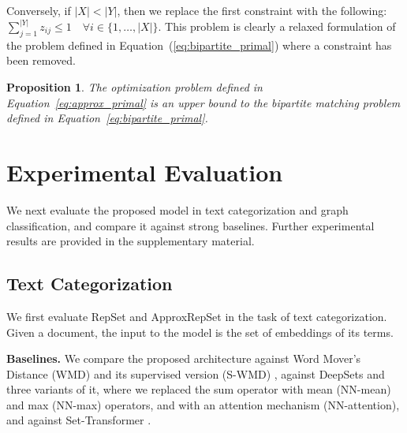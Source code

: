 \documentclass[twoside]{article}
\newtheorem{proposition}{Proposition}
\begin{document}
Conversely, if $|X| < |Y|$, then we replace the first constraint with the following: $\sum_{j=1}^{|Y|} z_{ij} \leq 1 \quad \forall i \in \{ 1,\ldots,|X| \} $.
This problem is clearly a relaxed formulation of the problem defined in Equation~(\ref{eq:bipartite_primal}) where a constraint has been removed.
\begin{proposition}
    The optimization problem defined in Equation~\ref{eq:approx_primal} is an upper bound to the bipartite matching problem defined in Equation~\ref{eq:bipartite_primal}.
\end{proposition}

\section{Experimental Evaluation}\label{sec:experiments}
We next evaluate the proposed model in text categorization and graph classification, and compare it against strong baselines.
Further experimental results are provided in the supplementary material.

\subsection{Text Categorization}
We first evaluate RepSet and ApproxRepSet in the task of text categorization.
Given a document, the input to the model is the set of embeddings of its terms.

\noindent\textbf{Baselines.}
We compare the proposed architecture against Word Mover's Distance (WMD) \citep{kusner2015word} and its supervised version (S-WMD) \citep{huang2016supervised}, against DeepSets \citep{zaheer2017deep} and three variants of it, where we replaced the sum operator with mean (NN-mean) and max (NN-max) operators, and with an attention mechanism (NN-attention), and against Set-Transformer \citep{lee2019set}.
\end{document}
